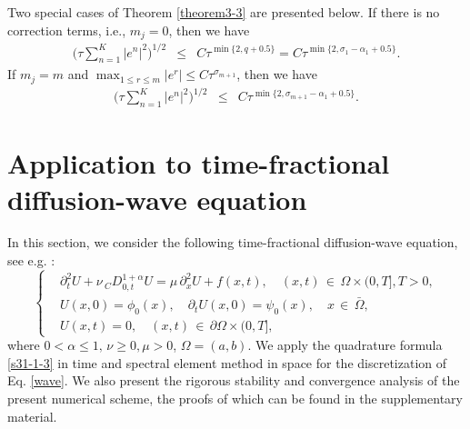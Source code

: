\documentclass[10pt]{siamltex}
\newcommand{\px}[1][x]{\partial_{#1}}
\begin{document}
Two special cases of Theorem \ref{theorem3-3} are presented below. If there is no correction terms, i.e., $m_j=0$, then we have
\begin{eqnarray}
\bigg(\tau\sum_{n=1}^K|e^n|^2\bigg)^{1/2}
&\leq&C\tau^{\min\{2,q+ 0.5\}}=C\tau^{\min\{2, \sigma_1-\alpha_1+ 0.5\}}.
\label{apx-fode4-7}
\end{eqnarray}
If $m_j=m$ and $\max_{1\leq r \leq m}|e^r|\leq C\tau^{\sigma_{m+1}}$, then we have
\begin{eqnarray}
\bigg(\tau\sum_{n=1}^K|e^n|^2\bigg)^{1/2}
&\leq&C\tau^{\min\{2,\sigma_{m+1}-\alpha_1+0.5\}}.
\label{apx-fode4-8}
\end{eqnarray}






\section{Application to   time-fractional diffusion-wave equation}\label{sec:3}
In this  section, we consider the following  time-fractional
diffusion-wave  equation,
see e.g. \cite{CaiCZh14,Liu-etal13}:
\begin{equation}\label{wave}
\left\{\begin{aligned}
&\px[t]^2U+\nu\,{}_{C}D_{0,t}^{1+\alpha}U=\mu\,\px^2 U+f(x,t),
{\quad}(x,t){\,\in\,}\Omega{\times}(0,T],T>0,\\
&U(x,0)=\phi_0(x),{\quad}\px[t]U(x,0)=\psi_0(x),{\quad}x{\,\in\,}\bar{\Omega},\\
&{U(x,t)=0,{\quad}(x,t){\,\in\,} \partial\Omega\times(0,T]},
\end{aligned}\right.
\end{equation}
where $0<\alpha\leq1,\,\nu\geq 0,\mu>0$, $\Omega=(a,b)$.
We apply the quadrature formula \eqref{s31-1-3} in time and
spectral element method in space for the discretization of Eq. \eqref{wave}.
We also present  the rigorous stability
and convergence analysis of the present numerical scheme,
the proofs of which  can be found in the supplementary material.
\end{document}
